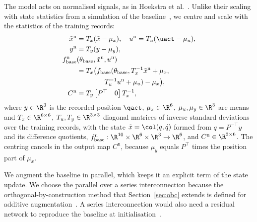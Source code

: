 The model acts on normalised signals, as in Hoekstra et
al.~\cite[Eq.~(28)]{hoekstra2026lfr}.
Unlike their scaling with state statistics from a simulation of the
baseline~\cite[Sec.~5.3]{hoekstra2026lfr}, we centre and scale with the
statistics of the training records:
\begin{equation}
\begin{aligned}
 \tilde x^{\mathrm n}&=T_x(\tilde x-\mu_x),\quad
 u^{\mathrm n}=T_u(\uact-\mu_u),\\
 y^{\mathrm n}&=T_y(y-\mu_y),\\
 f^{\mathrm n}_{\mathrm{base}}&(\theta_{\mathrm{base}},\tilde x^{\mathrm n},u^{\mathrm n})\\
 &=T_x\bigl(f_{\mathrm{base}}(\theta_{\mathrm{base}},
   T_x^{-1}\tilde x^{\mathrm n}+\mu_x,\\
 &\qquad\qquad T_u^{-1}u^{\mathrm n}+\mu_u)-\mu_x\bigr),\\
 C^{\mathrm n}&=T_y\begin{bmatrix}P^\top&0\end{bmatrix}T_x^{-1},
\end{aligned}
\label{eq:aug_norm}
\end{equation}
where $y\in\R^3$ is the recorded position $\qact$,
$\mu_x\in\R^6$, $\mu_u,\mu_y\in\R^3$ are means and
$T_x\in\R^{6\times6}$, $T_u,T_y\in\R^{3\times3}$ diagonal matrices of inverse
standard deviations over the training records, with the state
$\tilde x=\col(q,\dot q)$ formed from $q=P^{-\top}y$ and its difference
quotients, $f^{\mathrm n}_{\mathrm{base}}:\R^{10}\times\R^6\times\R^3\to\R^6$,
and $C^{\mathrm n}\in\R^{3\times6}$.
The centring cancels in the output map $C^{\mathrm n}$, because $\mu_y$ equals
$P^\top$ times the position part of $\mu_x$.

We augment the baseline in parallel, which keeps it an explicit term of the
state update.
We choose the parallel over a series interconnection because the
orthogonal-by-construction method that Section~\ref{sec:obc} extends is
defined for additive augmentation~\cite{gyorok2026obc}.
A series interconnection would also need a residual network to reproduce the
baseline at initialisation~\cite[Sec.~4.3]{hoekstra2025lfr}.


